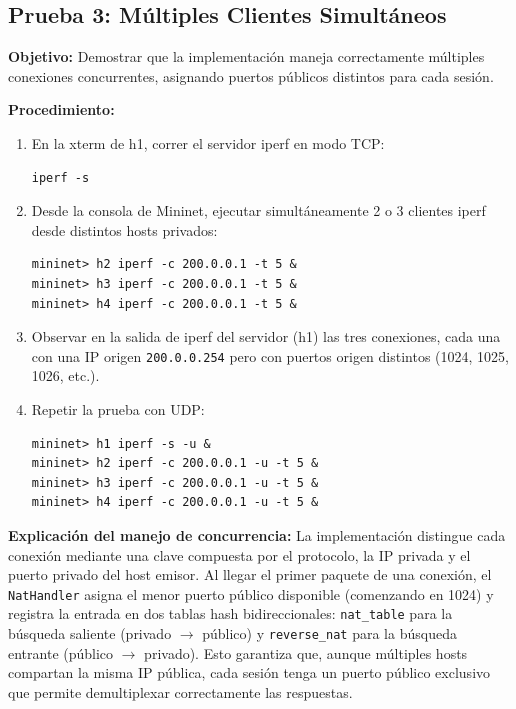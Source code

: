 \documentclass[11pt, a4paper]{article}
\begin{document}

\subsection{Prueba 3: Múltiples Clientes Simultáneos}

\textbf{Objetivo:} Demostrar que la implementación maneja correctamente múltiples conexiones concurrentes, asignando puertos públicos distintos para cada sesión.

\textbf{Procedimiento:}
\begin{enumerate}
    \item En la xterm de h1, correr el servidor iperf en modo TCP:
\begin{verbatim}
iperf -s
\end{verbatim}
    \item Desde la consola de Mininet, ejecutar simultáneamente 2 o 3 clientes iperf desde distintos hosts privados:
\begin{verbatim}
mininet> h2 iperf -c 200.0.0.1 -t 5 &
mininet> h3 iperf -c 200.0.0.1 -t 5 &
mininet> h4 iperf -c 200.0.0.1 -t 5 &
\end{verbatim}
    \item Observar en la salida de iperf del servidor (h1) las tres conexiones, cada una con una IP origen \texttt{200.0.0.254} pero con puertos origen distintos (1024, 1025, 1026, etc.).
    \item Repetir la prueba con UDP:
\begin{verbatim}
mininet> h1 iperf -s -u &
mininet> h2 iperf -c 200.0.0.1 -u -t 5 &
mininet> h3 iperf -c 200.0.0.1 -u -t 5 &
mininet> h4 iperf -c 200.0.0.1 -u -t 5 &
\end{verbatim}
\end{enumerate}

\textbf{Explicación del manejo de concurrencia:} La implementación distingue cada conexión mediante una clave compuesta por el protocolo, la IP privada y el puerto privado del host emisor. Al llegar el primer paquete de una conexión, el \texttt{NatHandler} asigna el menor puerto público disponible (comenzando en 1024) y registra la entrada en dos tablas hash bidireccionales: \texttt{nat\_table} para la búsqueda saliente (privado $\rightarrow$ público) y \texttt{reverse\_nat} para la búsqueda entrante (público $\rightarrow$ privado). Esto garantiza que, aunque múltiples hosts compartan la misma IP pública, cada sesión tenga un puerto público exclusivo que permite demultiplexar correctamente las respuestas.
\end{document}
